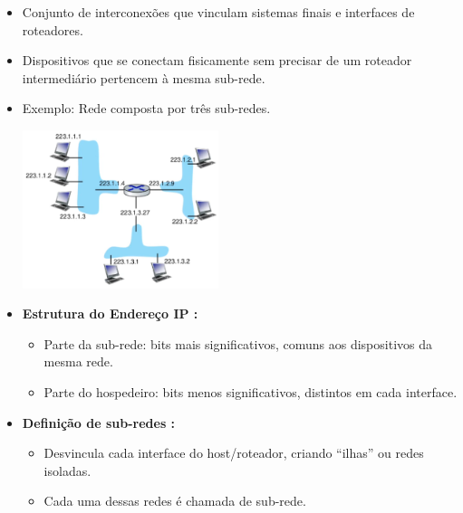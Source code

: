                 \begin{itemize}[left=0.5cm, align=left, nosep]
                    \item Conjunto de interconexões que vinculam sistemas finais e interfaces de roteadores.
                    \item Dispositivos que se conectam fisicamente sem precisar de um roteador intermediário pertencem à mesma sub-rede.
                    \item Exemplo: Rede composta por três sub-redes.

                    \begin{center}
                        \includegraphics[width=0.45\textwidth]{img/cap-04/introducao-endereco-ip.png}
                    \end{center}

                    \item \textbf{Estrutura do Endereço IP :}
                    \begin{itemize}[left=0.5cm, nosep, label=$\hookrightarrow$]
                        \item Parte da sub-rede: bits mais significativos, comuns aos dispositivos da mesma rede.
                        \item Parte do hospedeiro: bits menos significativos, distintos em cada interface.
                    \end{itemize}

                    \item \textbf{Definição de sub-redes :}
                    \begin{itemize}[left=0.5cm, nosep, label=$\hookrightarrow$]
                        \item Desvincula cada interface do host/roteador, criando “ilhas” ou redes isoladas.
                        \item Cada uma dessas redes é chamada de sub-rede.
                    \end{itemize}


\end{itemize}
